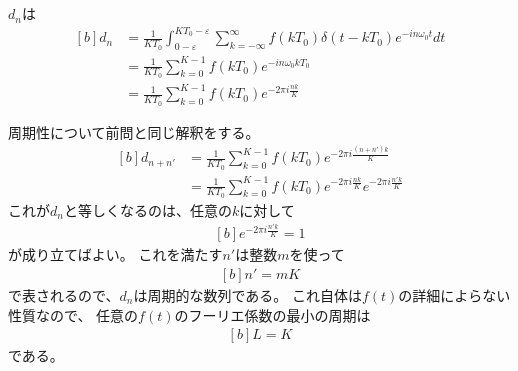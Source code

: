 \documentclass[../ap_2013.tex]{subfiles}
\begin{document}
\section{}
\(d_n\)は
\begin{equation}\begin{aligned}[b]
    d_n &= \frac{1}{KT_0}\int_{0-\varepsilon}^{KT_0-\varepsilon}\sum_{k=-\infty}^{\infty}
        f(kT_0)\delta(t-kT_0)e^{-in\omega_0t}dt\\
        &= \frac{1}{KT_0}\sum_{k=0}^{K-1}f(kT_0)e^{-in\omega_0kT_0}\\
        &=\frac{1}{KT_0}\sum_{k=0}^{K-1}f(kT_0)e^{-2\pi i\frac{nk}{K}}
\end{aligned}\end{equation}

周期性について前問と同じ解釈をする。
\begin{equation}\begin{aligned}[b]
    d_{n+n'} &=\frac{1}{KT_0}\sum_{k=0}^{K-1}f(kT_0)e^{-2\pi i\frac{(n+n')k}{K}}\\
    &=\frac{1}{KT_0}\sum_{k=0}^{K-1}f(kT_0)e^{-2\pi i\frac{nk}{K}}e^{-2\pi i\frac{n'k}{K}}
\end{aligned}\end{equation}
これが\(d_n\)と等しくなるのは、任意の\(k\)に対して
\begin{equation}\begin{aligned}[b]
    e^{-2\pi i\frac{n'k}{K}} = 1
\end{aligned}\end{equation}
が成り立てばよい。
これを満たす\(n'\)は整数\(m\)を使って
\begin{equation}\begin{aligned}[b]
    n' =mK
\end{aligned}\end{equation}
で表されるので、\(d_n\)は周期的な数列である。
これ自体は\(f(t)\)の詳細によらない性質なので、
任意の\(f(t)\)のフーリエ係数の最小の周期は
\begin{equation}\begin{aligned}[b]
    L = K
\end{aligned}\end{equation}
である。
\end{document}
